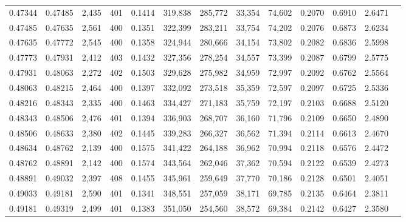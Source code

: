 \begin{tabular}{rrrrrrrrrrrrr}
0.47344 & 0.47485 & 2,435 & 401 &                                     0.1414 & 319,838 & 285,772 &  33,354 &  74,602 & 0.2070 & 0.6910 & 2.6471 \\
0.47485 & 0.47635 & 2,561 & 400 &                                     0.1351 & 322,399 & 283,211 &  33,754 &  74,202 & 0.2076 & 0.6873 & 2.6234 \\
0.47635 & 0.47772 & 2,545 & 400 &                                     0.1358 & 324,944 & 280,666 &  34,154 &  73,802 & 0.2082 & 0.6836 & 2.5998 \\
0.47773 & 0.47931 & 2,412 & 403 &                                     0.1432 & 327,356 & 278,254 &  34,557 &  73,399 & 0.2087 & 0.6799 & 2.5775 \\
0.47931 & 0.48063 & 2,272 & 402 &                                     0.1503 & 329,628 & 275,982 &  34,959 &  72,997 & 0.2092 & 0.6762 & 2.5564 \\
0.48063 & 0.48215 & 2,464 & 400 &                                     0.1397 & 332,092 & 273,518 &  35,359 &  72,597 & 0.2097 & 0.6725 & 2.5336 \\
0.48216 & 0.48343 & 2,335 & 400 &                                     0.1463 & 334,427 & 271,183 &  35,759 &  72,197 & 0.2103 & 0.6688 & 2.5120 \\
0.48343 & 0.48506 & 2,476 & 401 &                                     0.1394 & 336,903 & 268,707 &  36,160 &  71,796 & 0.2109 & 0.6650 & 2.4890 \\
0.48506 & 0.48633 & 2,380 & 402 &                                     0.1445 & 339,283 & 266,327 &  36,562 &  71,394 & 0.2114 & 0.6613 & 2.4670 \\
0.48634 & 0.48762 & 2,139 & 400 &                                     0.1575 & 341,422 & 264,188 &  36,962 &  70,994 & 0.2118 & 0.6576 & 2.4472 \\
0.48762 & 0.48891 & 2,142 & 400 &                                     0.1574 & 343,564 & 262,046 &  37,362 &  70,594 & 0.2122 & 0.6539 & 2.4273 \\
0.48891 & 0.49032 & 2,397 & 408 &                                     0.1455 & 345,961 & 259,649 &  37,770 &  70,186 & 0.2128 & 0.6501 & 2.4051 \\
0.49033 & 0.49181 & 2,590 & 401 &                                     0.1341 & 348,551 & 257,059 &  38,171 &  69,785 & 0.2135 & 0.6464 & 2.3811 \\
0.49181 & 0.49319 & 2,499 & 401 &                                     0.1383 & 351,050 & 254,560 &  38,572 &  69,384 & 0.2142 & 0.6427 & 2.3580 \\

\end{tabular}
